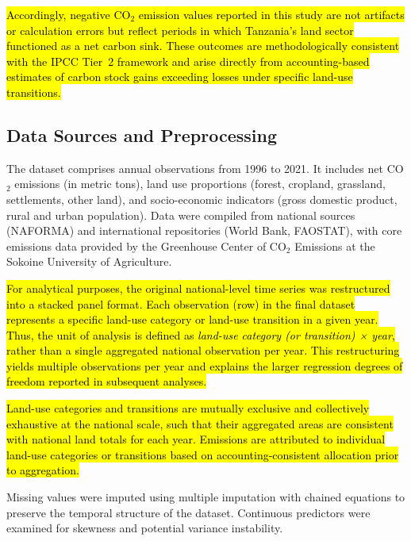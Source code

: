 \documentclass[10pt,letterpaper]{article}
\begin{document}
\hl{Accordingly, negative CO$_2$ emission values reported in this study are not artifacts or calculation errors but reflect periods in which Tanzania’s land sector functioned as a net carbon sink. These outcomes are methodologically consistent with the IPCC Tier~2 framework and arise directly from accounting-based estimates of carbon stock gains exceeding losses under specific land-use transitions.}



\subsection{Data Sources and Preprocessing}


The dataset comprises annual observations from 1996 to 2021. It includes net CO$_2$ emissions (in metric tons), land use proportions (forest, cropland, grassland, settlements, other land), and socio-economic indicators (gross domestic product, rural and urban population). Data were compiled from national sources (NAFORMA) and international repositories (World Bank, FAOSTAT), with core emissions data provided by the Greenhouse Center of CO$_2$ Emissions at the Sokoine University of Agriculture.

\hl{For analytical purposes, the original national-level time series was restructured into a stacked panel format. Each observation (row) in the final dataset represents a specific land-use category or land-use transition in a given year. Thus, the unit of analysis is defined as \textit{land-use category (or transition) × year}, rather than a single aggregated national observation per year. This restructuring yields multiple observations per year and explains the larger regression degrees of freedom reported in subsequent analyses.}

\hl{Land-use categories and transitions are mutually exclusive and collectively exhaustive at the national scale, such that their aggregated areas are consistent with national land totals for each year. Emissions are attributed to individual land-use categories or transitions based on accounting-consistent allocation prior to aggregation.}

Missing values were imputed using multiple imputation with chained equations to preserve the temporal structure of the dataset. Continuous predictors were examined for skewness and potential variance instability. %
\end{document}
